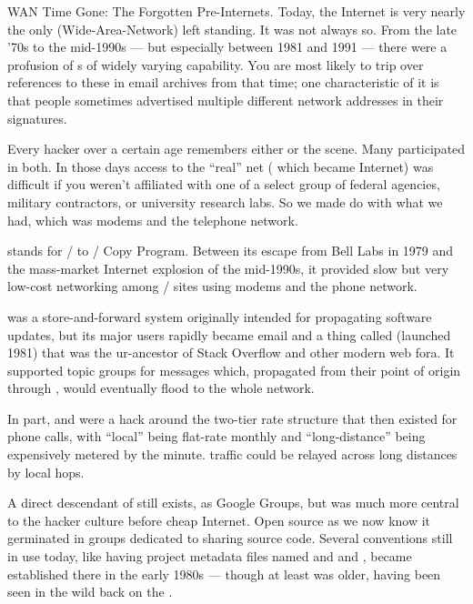 \sect WAN Time Gone: The Forgotten Pre-Internets.
Today, the  Internet is very nearly the only  (Wide-Area-Network) left
standing. It was not always so. From the late '70s to the mid-1990s --- but
especially between 1981 and 1991 --- there were a profusion of s of widely
varying capability. You are most likely to trip over references to these in
email archives from that time; one characteristic of it is that people
sometimes advertised multiple different network addresses in their signatures.

Every hacker over a certain age remembers either  or the  scene. Many
participated in both. In those days access to the ``real'' net ( which
became Internet) was difficult if you weren't affiliated with one of a select
group of federal agencies, military contractors, or university research labs.
So we made do with what we had, which was modems and the telephone network.

 stands for \UNIX/ to \UNIX/ Copy Program. Between its escape from Bell Labs in
1979 and the mass-market Internet explosion of the mid-1990s, it provided slow
but very low-cost networking among \UNIX/ sites using modems and the phone
network.

 was a store-and-forward system originally intended for propagating
software updates, but its major users rapidly became email and a thing called
 (launched 1981) that was the ur-ancestor of Stack Overflow and other
modern web fora. It supported topic groups for messages which, propagated from
their point of origin through , would eventually flood to the whole
network.

In part,  and  were a hack around the two-tier rate structure that
then existed for phone calls, with ``local'' being flat-rate monthly and
``long-distance'' being expensively metered by the minute.  traffic could be
relayed across long distances by local hops.

A direct descendant of  still exists, as Google Groups, but was much
more central to the hacker culture before cheap Internet. Open source as we now
know it germinated in  groups dedicated to sharing source code. Several
conventions still in use today, like having project metadata files named 
and  and , became established there in the early 1980s --- though at
least  was older, having been seen in the wild back on the .

